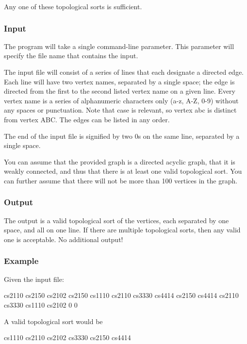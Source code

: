 Any one of these topological sorts is sufficient.

\subsubsection*{Input}

The program will take a single command-\/line parameter. This parameter will specify the file name that contains the input.

The input file will consist of a series of lines that each designate a directed edge. Each line will have two vertex names, separated by a single space; the edge is directed from the first to the second listed vertex name on a given line. Every vertex name is a series of alphanumeric characters only (a-\/z, A-\/Z, 0-\/9) without any spaces or punctuation. Note that case is relevant, so vertex {\ttfamily abc} is distinct from vertex {\ttfamily A\+BC}. The edges can be listed in any order.

The end of the input file is signified by two 0\textquotesingle{}s on the same line, separated by a single space.

You can assume that the provided graph is a directed acyclic graph, that it is weakly connected, and thus that there is at least one valid topological sort. You can further assume that there will not be more than 100 vertices in the graph.

\subsubsection*{Output}

The output is a valid topological sort of the vertices, each separated by one space, and all on one line. If there are multiple topological sorts, then any valid one is acceptable. No additional output!

\subsubsection*{Example}

Given the input file\+:


\begin{DoxyCode}
cs2110 cs2150
cs2102 cs2150
cs1110 cs2110
cs3330 cs4414
cs2150 cs4414
cs2110 cs3330
cs1110 cs2102
0 0
\end{DoxyCode}


A valid topological sort would be


\begin{DoxyCode}
cs1110 cs2110 cs2102 cs3330 cs2150 cs4414
\end{DoxyCode}
 



